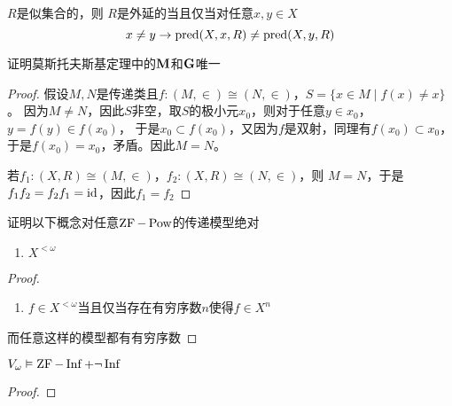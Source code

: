 \documentclass[11pt]{article}
\begin{document}
\begin{exercise}
\(R\)是似集合的，则
\(R\)是外延的当且仅当对任意\(x,y\in X\)
\begin{equation*}
x\neq y\to\text{pred}(X,x,R)\neq\text{pred}(X,y,R)
\end{equation*}
\end{exercise}

\begin{exercise}[7.10.7]
证明莫斯托夫斯基定理中的\(\operatorname{\textbf{M}}\)和\(\operatorname{\textbf{G}}\)唯一
\end{exercise}

\begin{proof}
假设\(M,N\)是传递类且\(f:(M,\in)\cong(N,\in)\)，\(S=\{x\in M\mid f(x)\neq x\}\)。
因为\(M\neq N\)，因此\(S\)非空，取\(S\)的极小元\(x_0\)，则对于任意\(y\in x_0\)，\(y=f(y)\in f(x_0)\)，
于是\(x_0\subset f(x_0)\)，又因为\(f\)是双射，同理有\(f(x_0)\subset x_0\)，于是\(f(x_0)=x_0\)，矛盾。因此\(M=N\)。

若\(f_1:(X,R)\cong(M,\in)\)，\(f_2:(X,R)\cong(N,\in)\)，则 \(M=N\)，于是\(f_1f_2=f_2f_1=\operatorname{id}\)，因此\(f_1=f_2\)
\end{proof}

\begin{exercise}[7.10.8]
证明以下概念对任意\(\operatorname{ZF}-\operatorname{Pow}\)的传递模型绝对
\begin{enumerate}
\item \(X^{<\omega}\)
\end{enumerate}
\end{exercise}

\begin{proof}
\begin{enumerate}
\item \(f\in X^{<\omega}\)当且仅当存在有穷序数\(n\)使得\(f\in X^n\)
\end{enumerate}

而任意这样的模型都有有穷序数
\end{proof}

\begin{exercise}[7.10.9]
\(V_\omega\vDash\operatorname{ZF}-\operatorname{Inf}+\neg\operatorname{Inf}\)
\end{exercise}

\begin{proof}

\end{proof}
\end{document}
